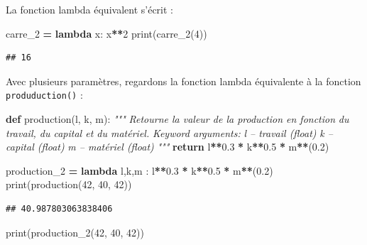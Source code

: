 \documentclass[12pt,]{book}
\newenvironment{Shaded}{\begin{snugshade}}{\end{snugshade}}
\newcommand{\KeywordTok}[1]{\textcolor[rgb]{0.13,0.29,0.53}{\textbf{#1}}}
\newcommand{\DecValTok}[1]{\textcolor[rgb]{0.00,0.00,0.81}{#1}}
\newcommand{\FloatTok}[1]{\textcolor[rgb]{0.00,0.00,0.81}{#1}}
\newcommand{\CommentTok}[1]{\textcolor[rgb]{0.56,0.35,0.01}{\textit{#1}}}
\newcommand{\ControlFlowTok}[1]{\textcolor[rgb]{0.13,0.29,0.53}{\textbf{#1}}}
\newcommand{\OperatorTok}[1]{\textcolor[rgb]{0.81,0.36,0.00}{\textbf{#1}}}
\newcommand{\BuiltInTok}[1]{#1}
\newcommand{\NormalTok}[1]{#1}
\numberwithin{equation}{section}
\numberwithin{countremarque}{section}
\begin{document}
La fonction lambda équivalent s'écrit :

\begin{Shaded}
\begin{Highlighting}[]
\NormalTok{carre_2 }\OperatorTok{=} \KeywordTok{lambda}\NormalTok{ x: x}\OperatorTok{**}\DecValTok{2}
\BuiltInTok{print}\NormalTok{(carre_2(}\DecValTok{4}\NormalTok{))}
\end{Highlighting}
\end{Shaded}

\begin{lstlisting}
## 16
\end{lstlisting}

Avec plusieurs paramètres, regardons la fonction lambda équivalente à la
fonction \texttt{produduction()} :

\begin{Shaded}
\begin{Highlighting}[]
\KeywordTok{def}\NormalTok{ production(l, k, m):}
  \CommentTok{"""}
\CommentTok{  Retourne la valeur de la production en fonction}
\CommentTok{  du travail, du capital et du matériel.}
\CommentTok{  }
\CommentTok{  Keyword arguments:}
\CommentTok{  l -- travail (float)}
\CommentTok{  k -- capital (float)}
\CommentTok{  m -- matériel (float)}
\CommentTok{  """}
  \ControlFlowTok{return}\NormalTok{ l}\OperatorTok{**}\FloatTok{0.3} \OperatorTok{*}\NormalTok{ k}\OperatorTok{**}\FloatTok{0.5} \OperatorTok{*}\NormalTok{ m}\OperatorTok{**}\NormalTok{(}\FloatTok{0.2}\NormalTok{)}
\end{Highlighting}
\end{Shaded}

\begin{Shaded}
\begin{Highlighting}[]
\NormalTok{production_2 }\OperatorTok{=} \KeywordTok{lambda}\NormalTok{ l,k,m : l}\OperatorTok{**}\FloatTok{0.3} \OperatorTok{*}\NormalTok{ k}\OperatorTok{**}\FloatTok{0.5} \OperatorTok{*}\NormalTok{ m}\OperatorTok{**}\NormalTok{(}\FloatTok{0.2}\NormalTok{)}
\BuiltInTok{print}\NormalTok{(production(}\DecValTok{42}\NormalTok{, }\DecValTok{40}\NormalTok{, }\DecValTok{42}\NormalTok{))}
\end{Highlighting}
\end{Shaded}

\begin{lstlisting}
## 40.987803063838406
\end{lstlisting}

\begin{Shaded}
\begin{Highlighting}[]
\BuiltInTok{print}\NormalTok{(production_2(}\DecValTok{42}\NormalTok{, }\DecValTok{40}\NormalTok{, }\DecValTok{42}\NormalTok{))}
\end{Highlighting}
\end{Shaded}
\end{document}
